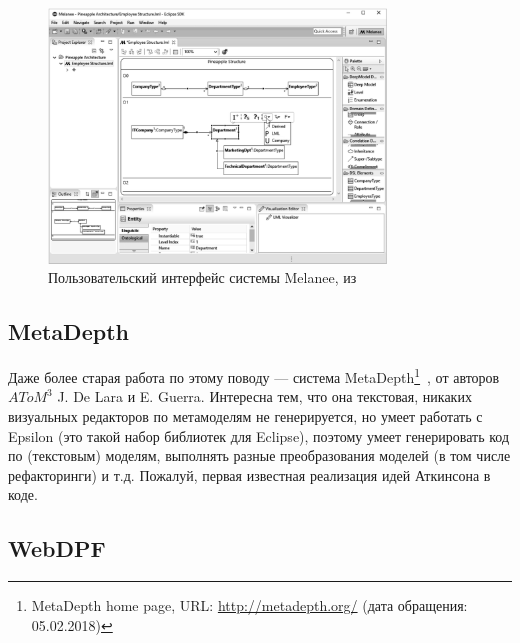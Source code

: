 \documentclass[a5paper]{article}
\begin{document}
\begin{figure}
	\begin{center}
		\includegraphics[width=0.8\textwidth]{melanee.png}
	\end{center}
	\caption{Пользовательский интерфейс системы Melanee, из~\cite{atkinson2016melanee}}
	\label{figure:melanee}
\end{figure}

\subsection{MetaDepth}

Даже более старая работа по этому поводу --- система MetaDepth\footnote{MetaDepth home page, URL: \url{http://metadepth.org/} (дата обращения: 05.02.2018)}~\cite{de2010deep}, от авторов $AToM^3$ J. De Lara и E. Guerra. Интересна тем, что она текстовая, никаких визуальных редакторов по метамоделям не генерируется, но умеет работать с Epsilon (это такой набор библиотек для Eclipse), поэтому умеет генерировать код по (текстовым) моделям, выполнять разные преобразования моделей (в том числе рефакторинги) и т.д. Пожалуй, первая известная реализация идей Аткинсона в коде.

\subsection{WebDPF}
\end{document}
